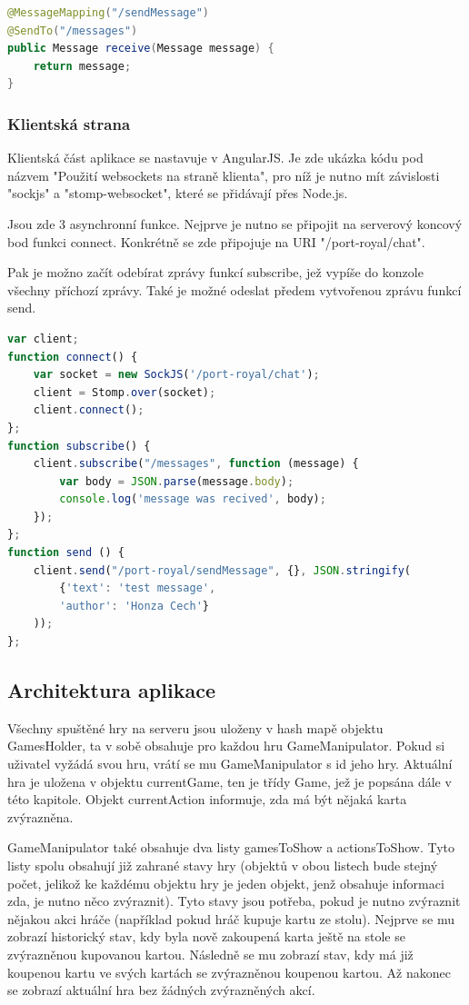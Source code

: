 \documentclass[czech,master,public,dept460,male,cpdeclaration,twoside]{diploma}
\begin{document}
\begin{lstlisting}[language=Java, caption=Implementace websockets v javě]
@MessageMapping("/sendMessage")
@SendTo("/messages")
public Message receive(Message message) {
    return message;
}
\end{lstlisting}

\subsubsection{Klientská strana}
Klientská část aplikace se nastavuje v AngularJS. Je zde ukázka kódu pod názvem "Použití websockets na straně klienta", pro níž je nutno mít závislosti "sockjs" a "stomp-websocket", které se přidávají přes Node.js.

Jsou zde 3 asynchronní funkce. Nejprve je nutno se připojit na serverový koncový bod funkci connect. Konkrétně se zde připojuje na URI "/port-royal/chat". 

Pak je možno začít odebírat zprávy funkcí subscribe, jež vypíše do konzole všechny příchozí zprávy. Také je možné odeslat předem vytvořenou zprávu funkcí send.
\\
\begin{lstlisting}[language=JavaScript, caption=Použití websockets na straně klienta]
var client;      
function connect() {
    var socket = new SockJS('/port-royal/chat');
    client = Stomp.over(socket);
    client.connect();
};
function subscribe() {
    client.subscribe("/messages", function (message) {
        var body = JSON.parse(message.body);
        console.log('message was recived', body);
    });
};
function send () {
    client.send("/port-royal/sendMessage", {}, JSON.stringify(
        {'text': 'test message',
        'author': 'Honza Cech'}
    ));
};
\end{lstlisting}

\subsection{Architektura aplikace}
Všechny spuštěné hry na serveru jsou uloženy v hash mapě objektu GamesHolder, ta v sobě obsahuje pro každou hru GameManipulator. Pokud si uživatel vyžádá svou hru, vrátí se mu GameManipulator s id jeho hry. Aktuální hra je uložena v objektu currentGame, ten je třídy Game, jež je popsána dále v této kapitole. Objekt currentAction informuje, zda má být nějaká karta zvýrazněna.

GameManipulator také obsahuje dva listy gamesToShow a actionsToShow. Tyto listy spolu obsahují již zahrané stavy hry (objektů v obou listech bude stejný počet, jelikož ke každému objektu hry je jeden objekt, jenž obsahuje informaci zda, je nutno něco zvýraznit). Tyto stavy jsou potřeba, pokud je nutno zvýraznit nějakou akci hráče (například pokud hráč kupuje kartu ze stolu). Nejprve se mu zobrazí historický stav, kdy byla nově zakoupená karta ještě na stole se zvýrazněnou kupovanou kartou. Následně se mu zobrazí stav, kdy má již koupenou kartu ve svých kartách se zvýrazněnou koupenou kartou. Až nakonec se zobrazí aktuální hra bez žádných zvýrazněných akcí.
\end{document}
